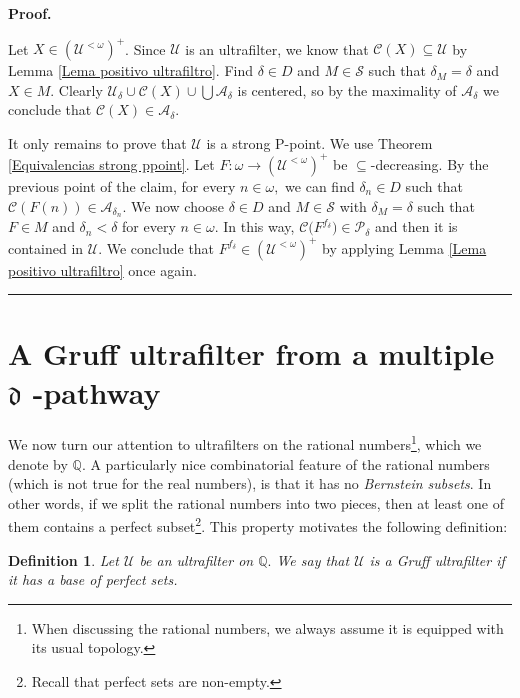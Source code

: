 \documentclass{article}%
\newtheorem{definition}[theorem]{Definition}
\newenvironment{proof}[1][Proof]{\noindent\textbf{#1.} }{\ \rule{0.5em}{0.5em}}
\begin{document}
\begin{proof}
\qquad\qquad\qquad\ \ 

Let $X\in\left(  \mathcal{U}^{<\omega}\right)  ^{+}$. Since $\mathcal{U}$ is
an ultrafilter, we know that $\mathcal{C}\left(  X\right)  \subseteq
\mathcal{U}$ by Lemma \ref{Lema positivo ultrafiltro}. Find $\delta\in D$ and
$M\in\mathcal{S}$ such that $\delta_{M}=\delta$ and $X\in M.$ Clearly
$\mathcal{U}_{\delta}\cup\mathcal{C}\left(  X\right)  \cup%
{\textstyle\bigcup}
\mathcal{A}_{\delta}$ is centered, so by the maximality of $\mathcal{A}%
_{\delta}$ we conclude that $\mathcal{C}\left(  X\right)  \in\mathcal{A}%
_{\delta}.$

\qquad\qquad

It only remains to prove that $\mathcal{U}$ is a strong \textsf{P}-point. We
use Theorem \ref{Equivalencias strong ppoint}. Let $F:\omega\longrightarrow
\left(  \mathcal{U}^{<\omega}\right)  ^{+}$ be $\subseteq$-decreasing$.$ By
the previous point of the claim, for every $n\in\omega,$ we can find
$\delta_{n}\in D$ such that $\mathcal{C}\left(  F\left(  n\right)  \right)
\in\mathcal{A}_{\delta_{n}}.$ We now choose $\delta\in D$ and $M\in
\mathcal{S}$ with $\delta_{M}=\delta$ such that $F\in M$ and $\delta
_{n}<\delta$ for every $n\in\omega.$ In this way, $\mathcal{C(}F^{f_{\delta}%
})\in\mathcal{P}_{\delta}$ and then it is contained in $\mathcal{U}.$ We
conclude that $F^{f_{\delta}}\in\left(  \mathcal{U}^{<\omega}\right)  ^{+}$ by
applying Lemma \ref{Lema positivo ultrafiltro} once again.
\end{proof}

\section{A Gruff ultrafilter from a multiple $\mathfrak{d}$%
-pathway\label{Gruff}}

We now turn our attention to ultrafilters on the rational
numbers\footnote{When discussing the rational numbers, we always assume it is
equipped with its usual topology.}, which we denote by $\mathbb{Q}$. A
particularly nice combinatorial feature of the rational numbers (which is not
true for the real numbers), is that it has no \emph{Bernstein subsets}. In
other words, if we split the rational numbers into two pieces, then at least
one of them contains a perfect subset\footnote{Recall that perfect sets are
non-empty.}. This property motivates the following definition:

\begin{definition}
Let $\mathcal{U}$ be an ultrafilter on $\mathbb{Q}.$ We say that $\mathcal{U}$
is a \emph{Gruff ultrafilter }if it has a base of perfect sets.
\end{definition}
\end{document}
